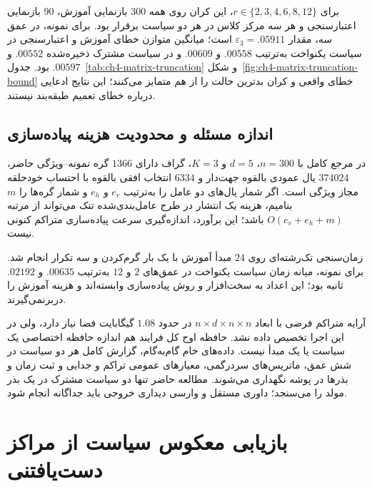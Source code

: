 برای $r\in\{2,3,4,6,8,12\}$،
این کران روی همه $300$ بازنمایی آموزش،
$90$ بازنمایی اعتبارسنجی و هر سه مرکز
کلاس در هر دو سیاست برقرار بود.
برای نمونه، در عمق سه، مقدار
$\varepsilon_3=.05911$ است؛
میانگین متوازن خطای آموزش و اعتبارسنجی
در سیاست یکنواخت به‌ترتیب $.00558$ و $.00609$
و در سیاست مشترک ذخیره‌شده $.00552$ و $.00597$
بود. جدول~\ref{tab:ch4-matrix-truncation}
و شکل~\ref{fig:ch4-matrix-truncation-bound}
خطای واقعی و کران بدترین حالت را از هم متمایز
می‌کنند؛ این نتایج ادعایی درباره خطای تعمیم
طبقه‌بند نیستند.



\subsection{اندازه مسئله و محدودیت هزینه پیاده‌سازی}
\label{subsec:ch4-matrix-cost}
در مرجع کامل با $n=300$، $d=5$ و $K=3$،
گراف دارای $1366$ گره نمونه--ویژگی حاضر،
$374024$ یال عمودی بالقوه جهت‌دار و
$6334$ انتخاب افقی بالقوه با احتساب
خودحلقه مجاز ویژگی است.
اگر شمار یال‌های دو عامل را به‌ترتیب
$e_v$ و $e_h$ و شمار گره‌ها را $m$ بنامیم،
هزینه یک انتشار در طرح عامل‌بندی‌شده
تنک می‌تواند از مرتبه $O(e_v+e_h+m)$ باشد؛
این برآورد، اندازه‌گیری سرعت پیاده‌سازی
متراکم کنونی نیست.

زمان‌سنجی  تک‌رشته‌ای روی
$24$ مبدأ آموزش با یک بار گرم‌کردن و
سه تکرار انجام شد. برای نمونه،
میانه زمان سیاست یکنواخت در عمق‌های
$2$ و $12$ به‌ترتیب $.00635$ و $.02192$
ثانیه بود؛ این اعداد به سخت‌افزار
و روش پیاده‌سازی وابسته‌اند و هزینه آموزش
را دربرنمی‌گیرند.


آرایه متراکم فرضی با ابعاد
$n\times d\times n\times n$ در
 حدود $1.08$ گیگابایت
فضا نیاز دارد، ولی در این اجرا تخصیص
داده نشد. حافظه اوج  کل فرایند
هم اندازه حافظه اختصاصی یک سیاست یا
یک مبدأ نیست. داده‌های خام گام‌به‌گام،
گزارش کامل هر دو سیاست در شش عمق،
ماتریس‌های سردرگمی، معیارهای عمومی
تراکم و جدایی و ثبت زمان و بذرها
در پوشه
نگهداری می‌شوند. مطالعه حاضر تنها
دو سیاست مشترک در یک بذر مولد را
می‌سنجد؛ داوری مستقل و وارسی دیداری
خروجی  باید جداگانه انجام شود.


\section{بازیابی معکوس سیاست از مراکز دست‌یافتنی}
\label{sec:ch4-inverse-attainable}

